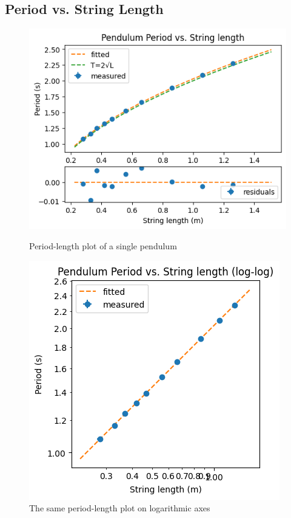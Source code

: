 \documentclass[12pt]{article}
\begin{document}


\subsection{Period vs. String Length} \label{section:period-length}

\begin{figure}[!htb]
\includegraphics[width=\linewidth]{period-length.png}
\caption{Period-length plot of a single pendulum}\label{fig:period-length}
\endminipage\hfill
{}
\includegraphics[width=\linewidth]{period-length-log.png}
\caption{The same period-length plot on logarithmic axes}\label{fig:period-length-log}
\endminipage
\end{figure}
\end{document}

